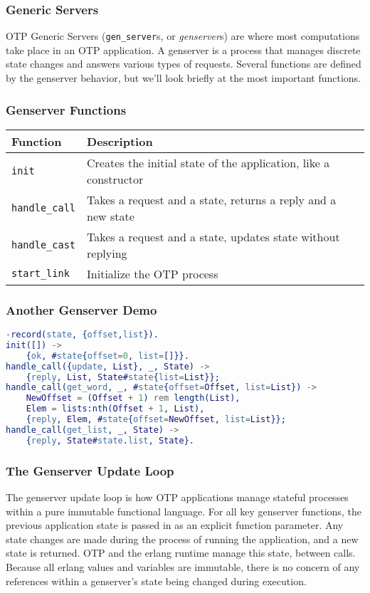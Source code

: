 \documentclass{beamer}
\begin{document}
\begin{frame}
  \frametitle{Generic Servers}
  OTP Generic Servers ({\tt gen\_server}s, or \emph{genserver}s) are
  where most computations take place in an OTP application. A
  genserver is a process that manages discrete state changes and
  answers various types of requests.  Several functions are defined by
  the genserver behavior, but we'll look briefly at the most important
  functions.
\end{frame}

\begin{frame}
  \frametitle{Genserver Functions}
  \begin{tabular}{|l|p{2.5in}|}
    \hline
    Function & Description \\
    \hline
    {\tt init} & Creates the initial state of the application, like a constructor \\
    \hline
    {\tt handle\_call} & Takes a request and a state, returns a reply and a new state \\
    \hline
    {\tt handle\_cast} & Takes a request and a state, updates state without replying \\
    \hline
    {\tt start\_link} & Initialize the OTP process \\
    \hline
  \end{tabular}
\end{frame}

\begin{frame}[fragile]
  \frametitle{Another Genserver Demo}
\begin{lstlisting}[language=erlang]
-record(state, {offset,list}).
init([]) ->
    {ok, #state{offset=0, list=[]}}.
handle_call({update, List}, _, State) ->
    {reply, List, State#state{list=List}};
handle_call(get_word, _, #state{offset=Offset, list=List}) ->
    NewOffset = (Offset + 1) rem length(List),
    Elem = lists:nth(Offset + 1, List),
    {reply, Elem, #state{offset=NewOffset, list=List}};
handle_call(get_list, _, State) ->
    {reply, State#state.list, State}.
\end{lstlisting}
\end{frame}

\begin{frame}
  \frametitle{The Genserver Update Loop}
  The genserver update loop is how OTP applications manage stateful
  processes within a pure immutable functional language.  For all key
  genserver functions, the previous application state is passed in as
  an explicit function parameter.  Any state changes are made during
  the process of running the application, and a new state is returned.
  OTP and the erlang runtime manage this state, between calls.
  Because all erlang values and variables are immutable, there is no
  concern of any references within a genserver's state being changed
  during execution.
\end{frame}
\end{document}
